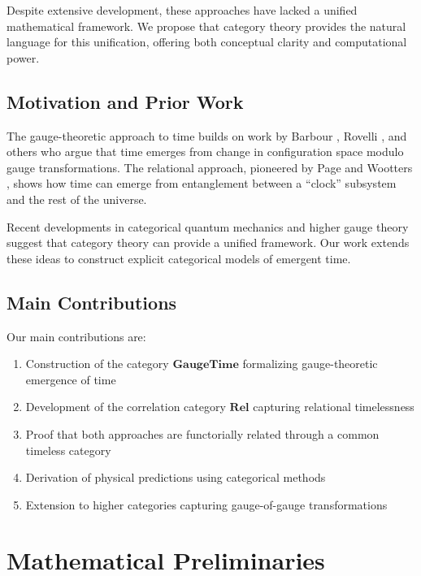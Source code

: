 \documentclass[12pt,a4paper]{article}
\begin{document}
Despite extensive development, these approaches have lacked a unified mathematical framework. We propose that category theory provides the natural language for this unification, offering both conceptual clarity and computational power.

\subsection{Motivation and Prior Work}

The gauge-theoretic approach to time builds on work by Barbour \cite{barbour1999end}, Rovelli \cite{rovelli2004quantum}, and others who argue that time emerges from change in configuration space modulo gauge transformations. The relational approach, pioneered by Page and Wootters \cite{page1983evolution}, shows how time can emerge from entanglement between a ``clock'' subsystem and the rest of the universe.

Recent developments in categorical quantum mechanics \cite{coecke2017picturing} and higher gauge theory \cite{baez2011higher} suggest that category theory can provide a unified framework. Our work extends these ideas to construct explicit categorical models of emergent time.

\subsection{Main Contributions}

Our main contributions are:

\begin{enumerate}
\item Construction of the category $\mathbf{GaugeTime}$ formalizing gauge-theoretic emergence of time
\item Development of the correlation category $\mathbf{Rel}$ capturing relational timelessness
\item Proof that both approaches are functorially related through a common timeless category
\item Derivation of physical predictions using categorical methods
\item Extension to higher categories capturing gauge-of-gauge transformations
\end{enumerate}

\section{Mathematical Preliminaries}
\end{document}

